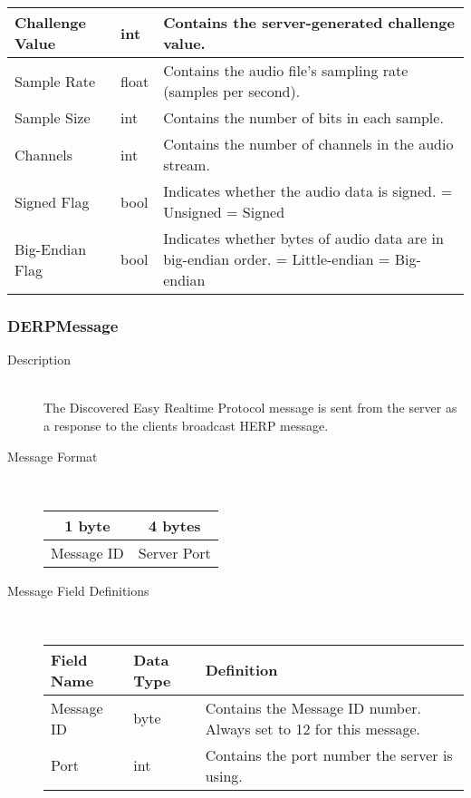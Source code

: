 \documentclass[12pt,letterpaper,titlepage]{article}
\begin{document}
\begin{description}
\begin{tabular}{ | p{3cm} | p{1.5cm} | p{8cm} | }
		\hline
		Challenge Value & int & Contains the server-generated challenge value.  \\
		\hline
		Sample Rate & float & Contains the audio file's sampling rate (samples per second).  \\
		\hline
		Sample Size & int & Contains the number of bits in each sample.  \\
		\hline
		Channels & int & Contains the number of channels in the audio stream.  \\
		\hline
		Signed Flag & bool & Indicates whether the audio data is signed. 
						\newline 0 = Unsigned
						\newline 1 = Signed \\
		\hline
		Big-Endian Flag & bool & Indicates whether bytes of audio data are in big-endian order. 
						\newline 0 = Little-endian
						\newline 1 = Big-endian \\
		\hline
	\end{tabular}
	\end{description}
	
		\subsubsection{DERPMessage}
	\begin{description}
	\item[Description] \hfill \\
		The Discovered Easy Realtime Protocol message is sent from the server as a response to the clients broadcast HERP message.
	\item[Message Format] \hfill \\
	\begin{tabular}{ | c | c | }
		\hline
		1 byte & 4 bytes\\
		\hline
		Message ID & Server Port \\
		\hline
	\end{tabular}
	\item[Message Field Definitions] \hfill \\
	\begin{tabular}{ | p{3cm} | p{1.5cm} | p{8cm} | }
		\hline
		Field Name & Data Type & Definition \\
		\hline
		Message ID & byte & Contains the Message ID number. 
					\newline Always set to 12 for this message. \\
		\hline
		Port & int & Contains the port number the server is using. \\
		\hline
	\end{tabular}
	\end{description}
	
\end{document}
